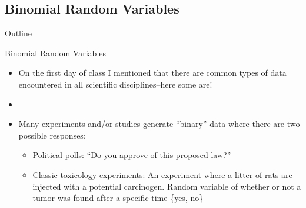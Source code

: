 \documentclass[xcolor=dvipsnames]{beamer}
\begin{document}
\subsection{Binomial Random Variables}
\begin{frame}{Outline}
	\tableofcontents[currentsection,subsectionstyle=show/shaded/hide]
\end{frame}

\begin{frame}{Binomial Random Variables}
	\begin{itemize}
		\item On the first day of class I mentioned that there are common types of data encountered in all scientific disciplines--here some are! \pause
		\item[]
		\item Many experiments and/or studies generate ``binary'' data where there are two possible responses: \pause
		\begin{itemize}
			\item Political polls: ``Do you approve of this proposed law?'' \pause
			\item Classic toxicology experiments: An experiment where a litter of rats are injected with a potential carcinogen. Random variable of whether or not a tumor was found after a specific time \{yes, no\}
		\end{itemize}
	\end{itemize}
\end{frame}
\end{document}
